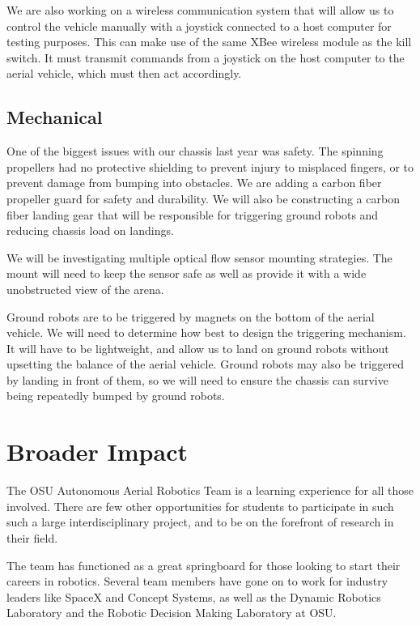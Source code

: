 \documentclass[12pt,letterpaper]{article}
\begin{document}
We are also working on a wireless communication system that will allow us to
control the vehicle manually with a joystick connected to a host computer for
testing purposes. This can make use of the same XBee wireless module as the
kill switch. It must transmit commands from a joystick on the host computer to
the aerial vehicle, which must then act accordingly.

\subsection*{Mechanical}
One of the biggest issues with our chassis last year was safety. The spinning
propellers had no protective shielding to prevent injury to misplaced fingers,
or to prevent damage from bumping into obstacles. We are adding a carbon fiber
propeller guard for safety and durability. We will also be constructing a carbon
fiber landing gear that will be responsible for triggering ground robots and
reducing chassis load on landings.

We will be investigating multiple optical flow sensor mounting strategies. The
mount will need to keep the sensor safe as well as provide it with a wide
unobstructed view of the arena.

Ground robots are to be triggered by magnets on the bottom of the aerial
vehicle. We will need to determine how best to design the triggering mechanism.
It will have to be lightweight, and allow us to land on ground robots without
upsetting the balance of the aerial vehicle. Ground robots may also be triggered
by landing in front of them, so we will need to ensure the chassis can survive
being repeatedly bumped by ground robots.

\section*{Broader Impact}
The OSU Autonomous Aerial Robotics Team is a learning experience for all those
involved. There are few other opportunities for students to participate in such
such a large interdisciplinary project, and to be on the forefront of research
in their field.

The team has functioned as a great springboard for those looking to start their
careers in robotics. Several team members have gone on to work for industry
leaders like SpaceX and Concept Systems, as well as the Dynamic Robotics
Laboratory and the Robotic Decision Making Laboratory at OSU.
\end{document}

